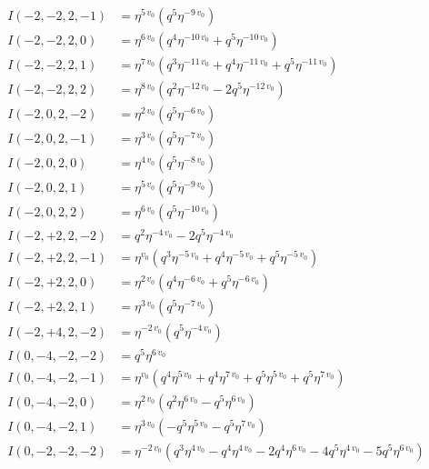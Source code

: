 \documentclass{article}
\begin{document}
\begin{align*}
I(-2, -2, 2, -1) &= \eta^{5 \, v_{0}} \left( q^{5} \eta^{-9 \, v_{0}} \right) \\
I(-2, -2, 2, 0) &= \eta^{6 \, v_{0}} \left( q^{4} \eta^{-10 \, v_{0}} + q^{5} \eta^{-10 \, v_{0}} \right) \\
I(-2, -2, 2, 1) &= \eta^{7 \, v_{0}} \left( q^{3} \eta^{-11 \, v_{0}} + q^{4} \eta^{-11 \, v_{0}} + q^{5} \eta^{-11 \, v_{0}} \right) \\
I(-2, -2, 2, 2) &= \eta^{8 \, v_{0}} \left( q^{2} \eta^{-12 \, v_{0}} - 2 q^{5} \eta^{-12 \, v_{0}} \right) \\
I(-2, 0, 2, -2) &= \eta^{2 \, v_{0}} \left( q^{5} \eta^{-6 \, v_{0}} \right) \\
I(-2, 0, 2, -1) &= \eta^{3 \, v_{0}} \left( q^{5} \eta^{-7 \, v_{0}} \right) \\
I(-2, 0, 2, 0) &= \eta^{4 \, v_{0}} \left( q^{5} \eta^{-8 \, v_{0}} \right) \\
I(-2, 0, 2, 1) &= \eta^{5 \, v_{0}} \left( q^{5} \eta^{-9 \, v_{0}} \right) \\
I(-2, 0, 2, 2) &= \eta^{6 \, v_{0}} \left( q^{5} \eta^{-10 \, v_{0}} \right) \\
I(-2, +2, 2, -2) &= q^{2} \eta^{-4 \, v_{0}} - 2 q^{5} \eta^{-4 \, v_{0}} \\
I(-2, +2, 2, -1) &= \eta^{v_{0}} \left( q^{3} \eta^{-5 \, v_{0}} + q^{4} \eta^{-5 \, v_{0}} + q^{5} \eta^{-5 \, v_{0}} \right) \\
I(-2, +2, 2, 0) &= \eta^{2 \, v_{0}} \left( q^{4} \eta^{-6 \, v_{0}} + q^{5} \eta^{-6 \, v_{0}} \right) \\
I(-2, +2, 2, 1) &= \eta^{3 \, v_{0}} \left( q^{5} \eta^{-7 \, v_{0}} \right) \\
I(-2, +4, 2, -2) &= \eta^{-2 \, v_{0}} \left( q^{5} \eta^{-4 \, v_{0}} \right) \\
I(0, -4, -2, -2) &= q^{5} \eta^{6 \, v_{0}} \\
I(0, -4, -2, -1) &= \eta^{v_{0}} \left( q^{4} \eta^{5 \, v_{0}} + q^{4} \eta^{7 \, v_{0}} + q^{5} \eta^{5 \, v_{0}} + q^{5} \eta^{7 \, v_{0}} \right) \\
I(0, -4, -2, 0) &= \eta^{2 \, v_{0}} \left( q^{2} \eta^{6 \, v_{0}} - q^{5} \eta^{6 \, v_{0}} \right) \\
I(0, -4, -2, 1) &= \eta^{3 \, v_{0}} \left( -q^{5} \eta^{5 \, v_{0}} - q^{5} \eta^{7 \, v_{0}} \right) \\
I(0, -2, -2, -2) &= \eta^{-2 \, v_{0}} \left( q^{3} \eta^{4 \, v_{0}} - q^{4} \eta^{4 \, v_{0}} - 2 q^{4} \eta^{6 \, v_{0}} - 4 q^{5} \eta^{4 \, v_{0}} - 5 q^{5} \eta^{6 \, v_{0}} \right) \\

\end{align*}
\end{document}
